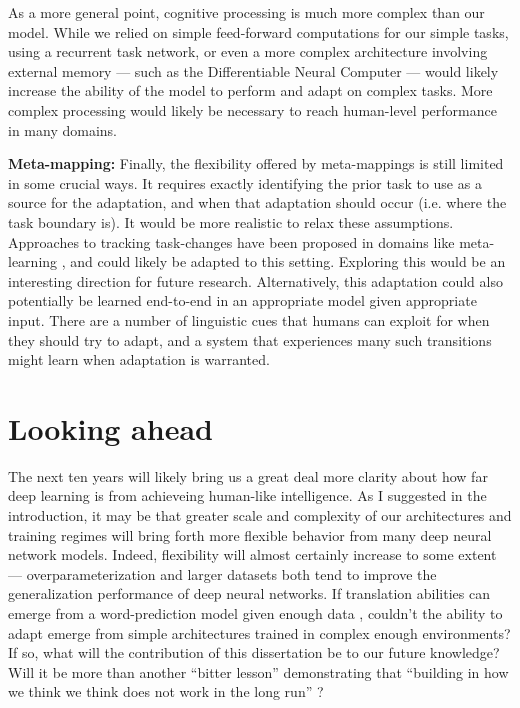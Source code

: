 As a more general point, cognitive processing is much more complex than our model. While we relied on simple feed-forward computations for our simple tasks, using a recurrent task network, or even a more complex architecture involving external memory --- such as the Differentiable Neural Computer \citep{Graves2016} --- would likely increase the ability of the model to perform and adapt on complex tasks. More complex processing would likely be necessary to reach human-level performance in many domains.\par 

\textbf{Meta-mapping:} Finally, the flexibility offered by meta-mappings is still limited in some crucial ways. It requires exactly identifying the prior task to use as a source for the adaptation, and when that adaptation should occur (i.e. where the task boundary is). It would be more realistic to relax these assumptions. Approaches to tracking task-changes have been proposed in domains like meta-learning \citep[e.g.][]{Nagabandi2019}, and could likely be adapted to this setting. Exploring this would be an interesting direction for future research. Alternatively, this adaptation could also potentially be learned end-to-end in an appropriate model given appropriate input. There are a number of linguistic cues that humans can exploit for when they should try to adapt, and a system that experiences many such transitions might learn when adaptation is warranted. \par 


\section{Looking ahead}

The next ten years will likely bring us a great deal more clarity about how far deep learning is from achieveing human-like intelligence. As I suggested in the introduction, it may be that greater scale and complexity of our architectures and training regimes will bring forth more flexible behavior from many deep neural network models. Indeed, flexibility will almost certainly increase to some extent --- overparameterization and larger datasets both tend to improve the generalization performance of deep neural networks. If translation abilities can emerge from a word-prediction model given enough data \citep{Radford2019}, couldn't the ability to adapt emerge from simple architectures trained in complex enough environments? If so, what will the contribution of this dissertation be to our future knowledge? Will it be more than another ``bitter lesson'' demonstrating that ``building in how we think we think does not work in the long run'' \citep{Sutton2019}? \par 

